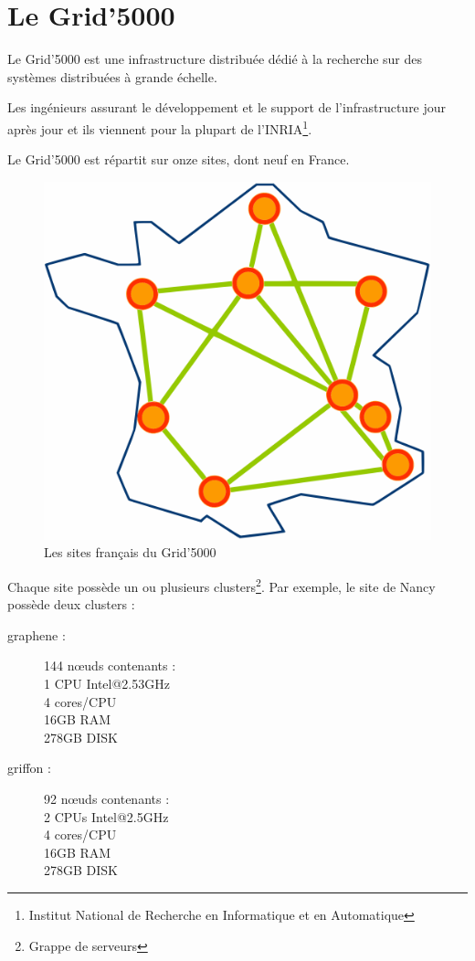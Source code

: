 \documentclass[12pt]{report}
\begin{document}
                        \newpage
		\section{Le Grid'5000}
		Le Grid'5000 est une infrastructure distribuée dédié à la recherche sur des systèmes distribuées à grande échelle.

		Les ingénieurs assurant le développement et le support de l'infrastructure jour après jour et ils viennent pour la plupart	de l'INRIA\footnote{Institut National de Recherche en Informatique et en Automatique}.

		Le Grid'5000 est répartit sur onze sites, dont neuf en France.

		\begin{figure}[H]
			\begin{center}
				\includegraphics[width=0.4\linewidth]{images/Site_map.png}
				\caption{Les sites français du Grid'5000}
			\end{center}
		\end{figure}

		Chaque site possède un ou plusieurs clusters\footnote{Grappe de serveurs}. Par exemple, le site de Nancy possède deux clusters :
		
		\begin{description}
			\item[graphene :] 144 nœuds contenants :\\
			1 CPU Intel@2.53GHz\\
			4 cores/CPU\\
			16GB RAM\\
			278GB DISK
			\item[griffon :] 92 nœuds contenants :\\
			2 CPUs Intel@2.5GHz\\
			4 cores/CPU\\
			16GB RAM\\
			278GB DISK
		\end{description}
                \newpage
                
\end{document}
